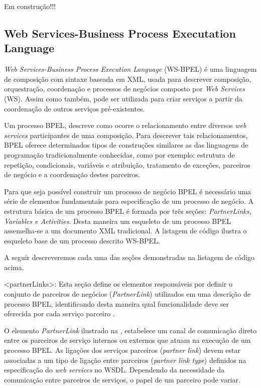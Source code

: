 Em construção!!!


\subsection{Web Services-Business Process Executation Language}
\label{WS-BPEL}
\textit{Web Services-Business Process Execution Language} (WS-BPEL) é uma linguagem de composição com sintaxe baseada em XML, usada para descrever composição, orquestração, coordenação e processos de negócios composto por \textit{Web Services} (WS)\cite{BPEL20}. Assim como também, pode ser utilizada para criar serviços a partir da coordenação de outros serviços pré-existentes.

Um processo BPEL, descreve como ocorre o relacionamento entre diversos \textit{web services} participantes de uma composição. Para descrever tais relacionamentos, BPEL oferece determinados tipos de construções similares as das linguagens de programação tradicionalmente conhecidas, como por exemplo: estrutura de repetição, condicionais, variáveis e atribuição, tratamento de exceções, parceiros de negócio e a coordenação destes parceiros. 

Para que seja possível construir um processo de negócio BPEL é necessário uma série de elementos fundamentais para especificação de um processo de negócio. A estrutura básica de um processo BPEL é formada por três seções: \textit{PartnerLinks, Variables e Activities}. Desta maneira um esqueleto de um processo BPEL assemelha-se a um documento XML tradicional. A  listagem de código ilustra o esqueleto base de um processo descrito WS-BPEL.



A seguir descreveremos cada uma das seções demonstradas na listagem de código acima.

<partnerLinks>: Esta seção define os elementos responsáveis por definir o conjunto de parceiros de negócios (\textit{PartnerLink}) utilizados em uma descrição de processo BPEL, identificando desta maneira qual funcionalidade deve ser oferecida por cada serviço parceiro \cite{BPEL20}.

O elemento \textit{PartnerLink} ilustrado na \href{Esqueleto de um processo BPEL.}, estabelece um canal de comunicação direto entre os parceiros de serviço internos ou externos que atuam na execução de um processo BPEL. As ligações dos serviços parceiros (\textit{partner link}) devem estar associadas a um tipo de ligação entre parceiros (\textit{partner link type}) definidos na especificação do \textit{web services} no WSDL. Dependendo da necessidade da comunicação entre parceiros de serviços, o papel de um parceiro pode variar\cite{BPEL20}. 

